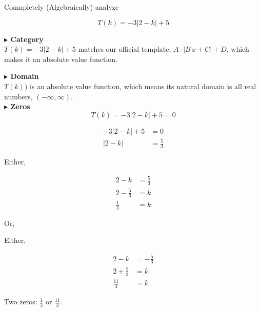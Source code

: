 \documentclass{ximera}
\begin{document}
\begin{example}

Comnpletely (Algebraically) analyze

\[
T(k) = -3 | 2 - k | + 5
\]









\textbf{\textcolor{blue!55!black}{$\blacktriangleright$ Category}} \\



$T(k) = -3 | 2 - k | + 5$ matches our official template, $A \cdot | B \, x + C| + D$, which makes it an absolute value function.  





\textbf{\textcolor{blue!55!black}{$\blacktriangleright$ Domain}} \\


$T(k))$ is an absolute value function, which means its natural domain is all real numbers, $(-\infty, \infty)$. \\






\textbf{\textcolor{blue!55!black}{$\blacktriangleright$ Zeros}} \\

\[
T(k) = -3 | 2 - k | + 5 = 0
\]

\begin{align*}
-3 | 2 - k | + 5 &= 0 \\
| 2 - k | &= \frac{5}{3} 
\end{align*}


Either,


\begin{align*}
2 - k &= \frac{5}{3} \\
2 - \frac{5}{3} &= k \\ 
\frac{1}{3} &= k 
\end{align*}


Or, 


Either,


\begin{align*}
2 - k &= -\frac{5}{3} \\
2 + \frac{5}{3} &= k \\ 
\frac{11}{3} &= k 
\end{align*}


Two zeros: $\frac{1}{3}$ or $\frac{11}{3}$. \\

















\end{example}
\end{document}
